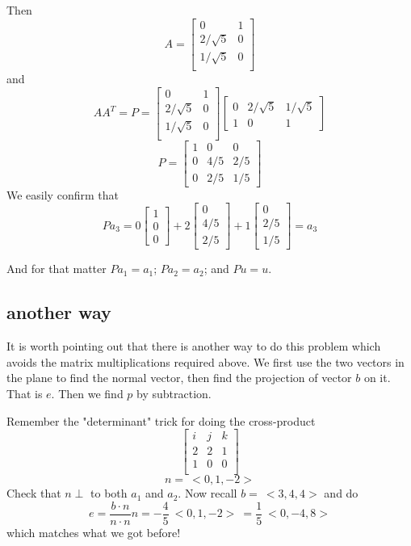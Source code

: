 \documentclass[11pt, oneside]{article}
\begin{document}
Then
\[ A =
\begin{bmatrix} 
  0  &  1   \\ 
  2/\sqrt{5}  &  0   \\
  1/\sqrt{5}  &  0   \\
\end{bmatrix}
\]
and 
\[ A A^T = P = 
\begin{bmatrix} 
  0  &  1   \\ 
  2/\sqrt{5}  &  0   \\
  1/\sqrt{5}  &  0   \\
\end{bmatrix}
\begin{bmatrix} 
  0  &  2/\sqrt{5} & 1/\sqrt{5}   \\ 
  1  &  0 & 1  
\end{bmatrix}
\]
\[P  = 
\begin{bmatrix} 
  1  &  0 & 0   \\ 
  0  &  4/5 & 2/5   \\ 
  0  &  2/5 & 1/5
\end{bmatrix}
\]
We easily confirm that 
\[ P a_3 =
0 
\begin{bmatrix} 
  1   \\ 
  0    \\ 
  0
  \end{bmatrix}
+
2
\begin{bmatrix} 
  0   \\ 
  4/5    \\ 
  2/5
  \end{bmatrix}
+
1
\begin{bmatrix} 
  0   \\ 
  2/5    \\ 
  1/5
  \end{bmatrix}
= a_3 \]

And for that matter $P a_1=a_1$;  $P a_2=a_2$; and $P u=u$.

\subsection*{another way}
It is worth pointing out that there is another way to do this problem which avoids the matrix multiplications required above.  We first use the two vectors in the plane to find the normal vector, then find the projection of vector $b$ on it.  That is $e$.  Then we find $p$ by subtraction.

Remember the "determinant" trick for doing the cross-product
\[ 
\begin{bmatrix} 
  i  &  j  &  k   \\ 
  2  &  2  &  1   \\
  1  &  0  &  0   \\
\end{bmatrix}
\]
\[ n = \ <0,1,-2> \]
Check that $n \perp$ to both $a_1$ and $a_2$.  Now recall $b= \ <3,4,4>$ and do
\[ e = \frac{b \cdot n}{n \cdot n} n = -\frac{4}{5} \ <0,1,-2> \  = \frac{1}{5} \ <0,-4,8>\]
which matches what we got before!
\end{document}
